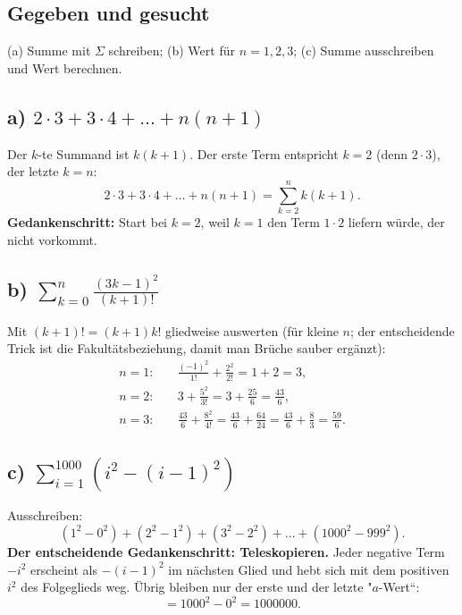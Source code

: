

\subsection*{Gegeben und gesucht}
(a) Summe mit $\Sigma$ schreiben; (b) Wert für $n=1,2,3$; (c) Summe
ausschreiben und Wert berechnen.

\subsection*{a) $2\cdot3+3\cdot4+\dots+n(n+1)$}
Der $k$-te Summand ist $k(k+1)$. Der erste Term entspricht $k=2$
(denn $2\cdot3$), der letzte $k=n$:
\begin{equation}
  2\cdot3+3\cdot4+\dots+n(n+1)=\sum_{k=2}^{n}k(k+1).
\end{equation}
\textbf{Gedankenschritt:} Start bei $k=2$, weil $k=1$ den Term $1\cdot2$
liefern würde, der nicht vorkommt.

\subsection*{b) $\sum_{k=0}^{n}\frac{(3k-1)^2}{(k+1)!}$}
Mit $(k+1)!=(k+1)k!$ gliedweise auswerten (für kleine $n$; der
entscheidende Trick ist die Fakultätsbeziehung, damit man Brüche
sauber ergänzt):
\begin{align}
  n=1:&\quad \frac{(-1)^2}{1!}+\frac{2^2}{2!}=1+2=3, \\
  n=2:&\quad 3+\frac{5^2}{3!}=3+\frac{25}{6}=\frac{43}{6}, \\
  n=3:&\quad \frac{43}{6}+\frac{8^2}{4!}=\frac{43}{6}+\frac{64}{24}
        =\frac{43}{6}+\frac{8}{3}=\frac{59}{6}.
\end{align}

\subsection*{c) $\sum_{i=1}^{1000}(i^2-(i-1)^2)$}
Ausschreiben:
\begin{equation}
  (1^2-0^2)+(2^2-1^2)+(3^2-2^2)+\dots+(1000^2-999^2).
\end{equation}
\textbf{Der entscheidende Gedankenschritt: Teleskopieren.} Jeder negative
Term $-i^2$ erscheint als $-(i-1)^2$ im nächsten Glied und hebt sich mit
dem positiven $i^2$ des Folgeglieds weg. Übrig bleiben nur der erste und
der letzte "$a$-Wert``:
\begin{equation}
  =1000^2-0^2=1000000 .
\end{equation}

